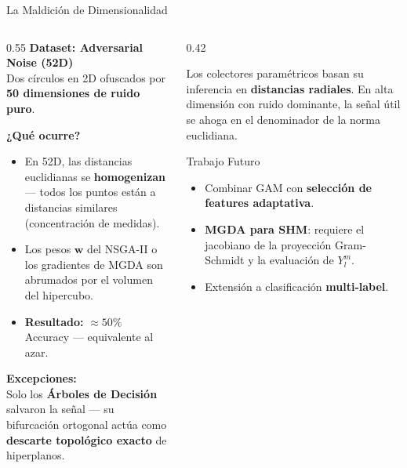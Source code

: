 \documentclass[aspectratio=169,10pt]{beamer}
\begin{document}
\begin{frame}{La Maldición de Dimensionalidad}
  \begin{columns}[T]
    \begin{column}{0.55\textwidth}
      \textbf{Dataset: Adversarial Noise (52D)}\\
      Dos círculos en 2D ofuscados por \textbf{50 dimensiones de ruido puro}.
      \vspace{6pt}

      \textbf{¿Qué ocurre?}
      \begin{itemize}
        \item En 52D, las distancias euclidianas se \textbf{homogenizan} — todos los puntos están a distancias similares (concentración de medidas).
        \item Los pesos $\mathbf{w}$ del NSGA-II o los gradientes de MGDA son abrumados por el volumen del hipercubo.
        \item \textbf{Resultado:} $\approx 50\%$ Accuracy — equivalente al azar.
      \end{itemize}

      \vspace{6pt}
      \textbf{Excepciones:}\\
      Solo los \textbf{Árboles de Decisión} salvaron la señal — su bifurcación ortogonal actúa como \textbf{descarte topológico exacto} de hiperplanos.
    \end{column}
    \begin{column}{0.42\textwidth}
      \begin{tcolorbox}[mywarn={Límite fundamental}]
        {\small Los colectores paramétricos basan su inferencia en \textbf{distancias radiales}. En alta dimensión con ruido dominante, la señal útil se ahoga en el denominador de la norma euclidiana.}
      \end{tcolorbox}
      \vspace{8pt}
      \begin{block}{Trabajo Futuro}
        \begin{itemize}
          \item Combinar GAM con \textbf{selección de features adaptativa}.
          \item \textbf{MGDA para SHM}: requiere el jacobiano de la proyección Gram-Schmidt y la evaluación de $Y_l^m$.
          \item Extensión a clasificación \textbf{multi-label}.
        \end{itemize}
      \end{block}
    \end{column}
  \end{columns}
\end{frame}
\end{document}
